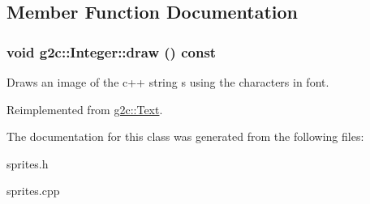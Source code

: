 \subsection{Member Function Documentation}
\hypertarget{classg2c_1_1_integer_aac99d7502a55bf5db01f5d673779e36e}{
\subsubsection[{draw}]{\setlength{\rightskip}{0pt plus 5cm}void g2c::Integer::draw () const}}
\label{classg2c_1_1_integer_aac99d7502a55bf5db01f5d673779e36e}
Draws an image of the c++ string s using the characters in font. 

Reimplemented from \hyperlink{classg2c_1_1_text_ab3296a30652c4c3157ae8a8e87449bb4}{g2c::Text}.

The documentation for this class was generated from the following files:\begin{DoxyCompactItemize}
\item 
sprites.h\item 
sprites.cpp\end{DoxyCompactItemize}
